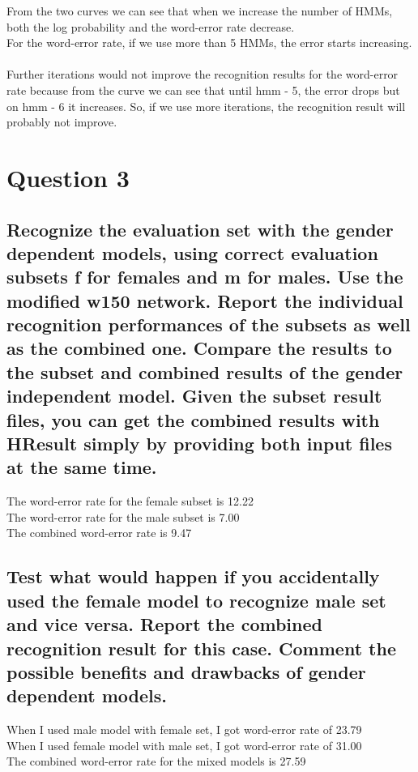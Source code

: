 \documentclass[17pt]{article}
\begin{document}
From the two curves we can see that when we increase the number of HMMs, both the log probability and the word-error rate decrease. \\
For the word-error rate, if we use more than 5 HMMs, the error starts increasing. \\~\\

Further iterations would not improve the recognition results for the word-error rate because from the curve we can see that until hmm - 5, the error drops but on hmm - 6 it increases. So, if we use more iterations, the recognition result will probably not improve.


\section{Question 3}

\subsection{Recognize the evaluation set with the gender dependent models, using correct evaluation subsets f for females and m for males. Use the modified w150 network. Report the individual recognition performances of the subsets as well as the combined one. Compare the results to the subset and combined results of the gender independent model. Given the subset result files, you can get the combined results with HResult simply by providing both input files at the same time.}

The word-error rate for the female subset is 12.22 \\
The word-error rate for the male subset is 7.00 \\
The combined word-error rate is 9.47 \\

\subsection{Test what would happen if you accidentally used the female model to recognize male set and vice versa. Report the combined recognition result for this case. Comment the possible benefits and drawbacks of gender dependent models.}

When I used male model with female set, I got word-error rate of 23.79 \\
When I used female model with male set, I got word-error rate of 31.00 \\
The combined word-error rate for the mixed models is 27.59 \\~\\
\end{document}
